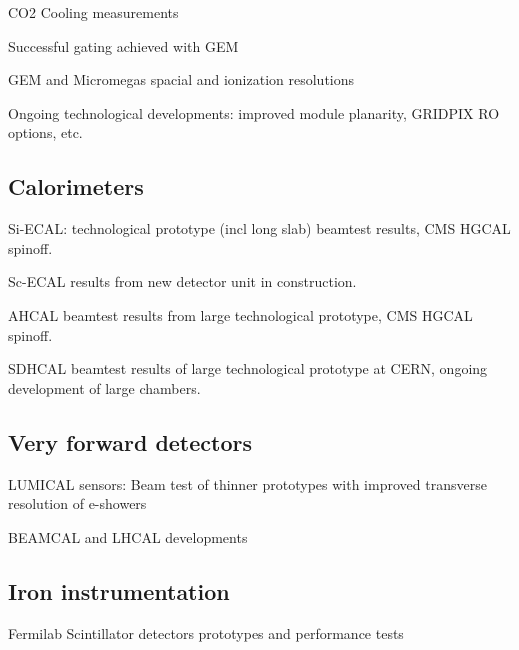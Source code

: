 CO2 Cooling measurements            

Successful gating achieved with GEM

GEM and Micromegas spacial and ionization resolutions

Ongoing technological developments: improved module planarity, GRIDPIX RO options, etc.  

\vspace{2cm}
\subsection{Calorimeters}

Si-ECAL: technological prototype (incl long slab) beamtest results, CMS HGCAL spinoff.

Sc-ECAL results from new detector unit in construction.

AHCAL beamtest results from large technological prototype, CMS HGCAL spinoff.

SDHCAL beamtest results of large technological prototype at CERN, ongoing development of large chambers. 

\vspace{2cm}
\subsection{Very forward detectors}

LUMICAL sensors: Beam test of thinner prototypes with improved transverse resolution of e-showers

BEAMCAL and LHCAL developments

\vspace{4cm}
\subsection{Iron instrumentation}

Fermilab Scintillator detectors prototypes and performance tests

\vspace{2cm}
